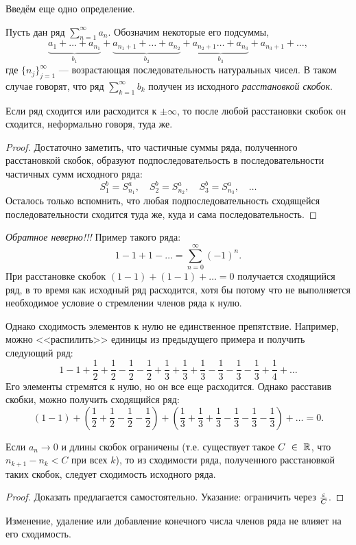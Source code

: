 \documentclass[a4paper, 12pt]{article}
\begin{document}
Введём еще одно определение.

\begin{Def}
	Пусть дан ряд $\sum\limits_{n=1}^{\infty}a_n$. Обозначим некоторые его подсуммы,
	$$
	\underbrace{a_1 + \ldots + a_{n_1}}_{b_1} + \underbrace{a_{n_1+1} + \ldots + a_{n_2}}_{b_2} + \underbrace{a_{n_2 + 1} \ldots + a_{n_3}}_{b_3} + a_{n_3 + 1} + \ldots,
	 $$
	 где $\{n_j\}_{j=1}^{\infty}$ --- возрастающая последовательность натуральных чисел. В таком случае говорят, что ряд $\sum\limits_{k =1}^{\infty} b_k$ получен из исходного \emph{расстановкой скобок}.
\end{Def}
\begin{Statement}
	Если ряд сходится или расходится к $\pm \infty$, то после любой расстановки скобок он сходится, неформально говоря, туда же.
\end{Statement}

\begin{proof}
	Достаточно заметить, что частичные суммы ряда, полученного расстановкой скобок, образуют подпоследовательость в последовательности частичных сумм исходного ряда:
	$$
	S^b_1 = S^a_{n_1}, \quad S^b_{2} = S^a_{n_2}, \quad S^b_3 = S^a_{n_3}, \quad \ldots
	$$
	Осталось только вспомнить, что любая подпоследовательность сходящейся последовательности сходится туда же, куда и сама последовательность.
\end{proof}
\emph{Обратное неверно!!!} Пример такого ряда:
$$
1 - 1 + 1 - \ldots = \sum\limits_{n = 0}^{\infty} \left(-1\right)^n.
$$
При расстановке скобок $(1 - 1) + (1 - 1) + \ldots = 0$ получается сходящийся ряд, в то время как исходный ряд расходится, хотя бы потому что не выполняется необходимое условие о стремлении членов ряда к нулю.

Однако сходимость элементов к нулю не единственное препятствие. Например, можно <<распилить>> единицы из предыдущего примера и получить следующий ряд:
$$
1 - 1 + \frac{1}{2} + \frac{1}{2} - \frac{1}{2} - \frac{1}{2} + \frac{1}{3} + \frac{1}{3} + \frac{1}{3} - \frac{1}{3} - \frac{1}{3} - \frac{1}{3} + \frac{1}{4} + \ldots
$$
Его элементы стремятся к нулю, но он все еще расходится. Однако расставив скобки, можно получить сходящийся ряд:
$$
(1 - 1) + \left(\frac{1}{2} + \frac{1}{2} - \frac{1}{2} - \frac{1}{2}\right) +\left( \frac{1}{3} + \frac{1}{3} + \frac{1}{3} - \frac{1}{3} - \frac{1}{3} - \frac{1}{3}\right) + \ldots = 0.
$$
\begin{Statement}
	Если $a_n \to 0$ и длины скобок ограничены (т.е. существует такое $C~\in~\mathbb{R}$, что $n_{k+1} - n_{k} < C$ при всех $k$), то из сходимости ряда, полученного расстановкой таких скобок, следует сходимость исходного ряда.
\end{Statement}
\begin{proof}
Доказать предлагается самостоятельно. Указание: ограничить через $\frac{\varepsilon}{C}$.
\end{proof}
\begin{Statement}
	Изменение, удаление или добавление конечного числа членов ряда не влияет на его сходимость.
\end{Statement}
\end{document}
